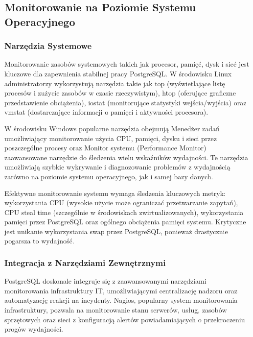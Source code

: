 \documentclass[letterpaper,10pt,polish]{sphinxmanual}
\begin{document}
\subsection{Monitorowanie na Poziomie Systemu Operacyjnego}
\label{\detokenize{rozdzial2/repo-wspolne/index:monitorowanie-na-poziomie-systemu-operacyjnego}}

\subsubsection{Narzędzia Systemowe}
\label{\detokenize{rozdzial2/repo-wspolne/index:narzedzia-systemowe}}
\sphinxAtStartPar
Monitorowanie zasobów systemowych takich jak procesor, pamięć, dysk i sieć jest kluczowe dla zapewnienia stabilnej pracy PostgreSQL. W środowisku Linux administratorzy wykorzystują narzędzia takie jak top (wyświetlające listę procesów i zużycie zasobów w czasie rzeczywistym), htop (oferujące graficzne przedstawienie obciążenia), iostat (monitorujące statystyki wejścia/wyjścia) oraz vmstat (dostarczające informacji o pamięci i aktywności procesora).

\sphinxAtStartPar
W środowisku Windows popularne narzędzia obejmują Menedżer zadań umożliwiający monitorowanie użycia CPU, pamięci, dysku i sieci przez poszczególne procesy oraz Monitor systemu (Performance Monitor) \sphinxhyphen{} zaawansowane narzędzie do śledzenia wielu wskaźników wydajności. Te narzędzia umożliwiają szybkie wykrywanie i diagnozowanie problemów z wydajnością zarówno na poziomie systemu operacyjnego, jak i samej bazy danych.

\sphinxAtStartPar
Efektywne monitorowanie systemu wymaga śledzenia kluczowych metryk: wykorzystania CPU (wysokie użycie może ograniczać przetwarzanie zapytań), CPU steal time (szczególnie w środowiskach zwirtualizowanych), wykorzystania pamięci przez PostgreSQL oraz ogólnego obciążenia pamięci systemu. Krytyczne jest unikanie wykorzystania swap przez PostgreSQL, ponieważ drastycznie pogarsza to wydajność.


\subsubsection{Integracja z Narzędziami Zewnętrznymi}
\label{\detokenize{rozdzial2/repo-wspolne/index:integracja-z-narzedziami-zewnetrznymi}}
\sphinxAtStartPar
PostgreSQL doskonale integruje się z zaawansowanymi narzędziami monitorowania infrastruktury IT, umożliwiającymi centralizację nadzoru oraz automatyzację reakcji na incydenty. Nagios, popularny system monitorowania infrastruktury, pozwala na monitorowanie stanu serwerów, usług, zasobów sprzętowych oraz sieci z konfiguracją alertów powiadamiających o przekroczeniu progów wydajności.
\end{document}
